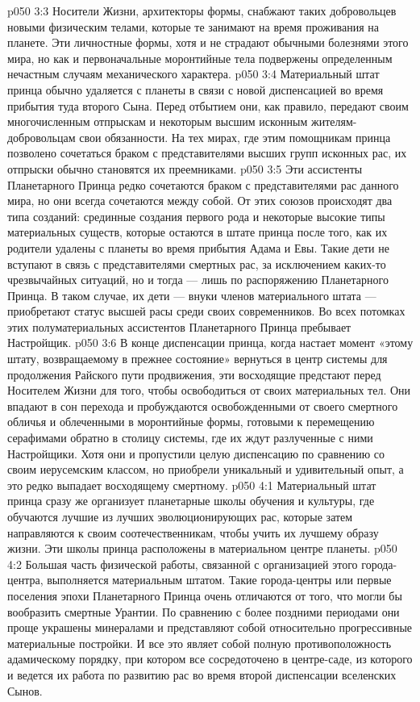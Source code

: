 \vs p050 3:3 Носители Жизни, архитекторы формы, снабжают таких добровольцев новыми физическим телами, которые те занимают на время проживания на планете. Эти личностные формы, хотя и не страдают обычными болезнями этого мира, но как и первоначальные моронтийные тела подвержены определенным нечастным случаям механического характера.
\vs p050 3:4 \pc Материальный штат принца обычно удаляется с планеты в связи с новой диспенсацией во время прибытия туда второго Сына. Перед отбытием они, как правило, передают своим многочисленным отпрыскам и некоторым высшим исконным жителям\hyp{}добровольцам свои обязанности. На тех мирах, где этим помощникам принца позволено сочетаться браком с представителями высших групп исконных рас, их отпрыски обычно становятся их преемниками.
\vs p050 3:5 Эти ассистенты Планетарного Принца редко сочетаются браком с представителями рас данного мира, но они всегда сочетаются между собой. От этих союзов происходят два типа созданий: срединные создания первого рода и некоторые высокие типы материальных существ, которые остаются в штате принца после того, как их родители удалены с планеты во время прибытия Адама и Евы. Такие дети не вступают в связь с представителями смертных рас, за исключением каких\hyp{}то чрезвычайных ситуаций, но и тогда --- лишь по распоряжению Планетарного Принца. В таком случае, их дети --- внуки членов материального штата --- приобретают статус высшей расы среди своих современников. Во всех потомках этих полуматериальных ассистентов Планетарного Принца пребывает Настройщик.
\vs p050 3:6 В конце диспенсации принца, когда настает момент «этому штату, возвращаемому в прежнее состояние» вернуться в центр системы для продолжения Райского пути продвижения, эти восходящие предстают перед Носителем Жизни для того, чтобы освободиться от своих материальных тел. Они впадают в сон перехода и пробуждаются освобожденными от своего смертного обличья и облеченными в моронтийные формы, готовыми к перемещению серафимами обратно в столицу системы, где их ждут разлученные с ними Настройщики. Хотя они и пропустили целую диспенсацию по сравнению со своим иерусемским классом, но приобрели уникальный и удивительный опыт, а это редко выпадает восходящему смертному.
\vs p050 4:1 Материальный штат принца сразу же организует планетарные школы обучения и культуры, где обучаются лучшие из лучших эволюционирующих рас, которые затем направляются к своим соотечественникам, чтобы учить их лучшему образу жизни. Эти школы принца расположены в материальном центре планеты.
\vs p050 4:2 Большая часть физической работы, связанной с организацией этого города\hyp{}центра, выполняется материальным штатом. Такие города\hyp{}центры или первые поселения эпохи Планетарного Принца очень отличаются от того, что могли бы вообразить смертные Урантии. По сравнению с более поздними периодами они проще украшены минералами и представляют собой относительно прогрессивные материальные постройки. И все это являет собой полную противоположность адамическому порядку, при котором все сосредоточено в центре\hyp{}саде, из которого и ведется их работа по развитию рас во время второй диспенсации вселенских Сынов.
